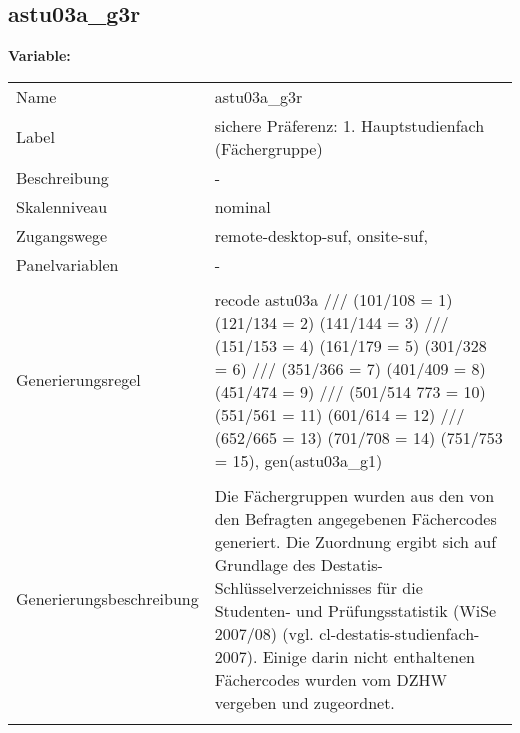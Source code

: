 	
	
	\subsection{astu03a\_g3r}
	\label{subSection:astu03a_g3r}

	\noindent\textbf{Variable:}\\
		\begin{tabular}{lL{11.3cm}}
			\label{tableVariable:astu03a_g3r}
			Name & astu03a\_g3r \\
			Label & sichere Präferenz: 1. Hauptstudienfach  (Fächergruppe) \\
			Beschreibung & - \\
			Skalenniveau & nominal \\
			Zugangswege &
				remote-desktop-suf,
				onsite-suf,
 \\
			Panelvariablen & -
			 \\
			 \\
					Generierungsregel & recode astu03a /// (101/108 = 1) (121/134 = 2) (141/144 = 3) ///
       (151/153 = 4) (161/179 = 5) (301/328 = 6) ///
              (351/366 = 7) (401/409 = 8) (451/474 = 9) ///
              (501/514 773 = 10) (551/561 = 11) (601/614 = 12) ///
       (652/665 = 13) (701/708 = 14) (751/753 = 15), gen(astu03a\_g1)
 \\
				 \\
					Generierungsbeschreibung & Die Fächergruppen wurden aus den von den Befragten angegebenen Fächercodes generiert. Die Zuordnung ergibt sich auf Grundlage des Destatis-Schlüsselverzeichnisses für die Studenten- und Prüfungsstatistik (WiSe 2007/08) (vgl. cl-destatis-studienfach-2007).  Einige darin nicht enthaltenen Fächercodes wurden vom DZHW vergeben und zugeordnet. 
				 \\	
			 \\
		\end{tabular}






